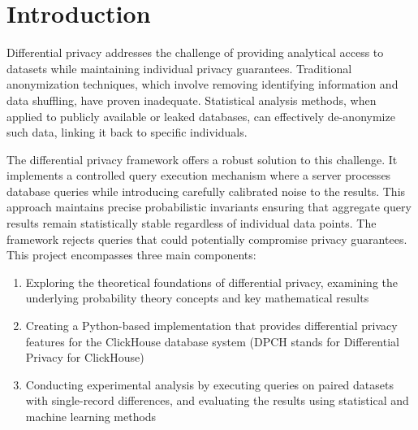 \documentclass[12pt,letterpaper]{article}
\begin{document}
\section{Introduction}
Differential privacy addresses the challenge of providing analytical access to datasets while maintaining individual privacy guarantees. Traditional anonymization techniques, which involve removing identifying information and data shuffling, have proven inadequate. Statistical analysis methods, when applied to publicly available or leaked databases, can effectively de-anonymize such data, linking it back to specific individuals.

The differential privacy framework offers a robust solution to this challenge. It implements a controlled query execution mechanism where a server processes database queries while introducing carefully calibrated noise to the results. This approach maintains precise probabilistic invariants ensuring that aggregate query results remain statistically stable regardless of individual data points. The framework rejects queries that could potentially compromise privacy guarantees.\\

This project encompasses three main components:
\begin{enumerate}
\item Exploring the theoretical foundations of differential privacy, examining the underlying probability theory concepts and key mathematical results
\item Creating a Python-based implementation that provides differential privacy features for the ClickHouse database system (DPCH stands for Differential Privacy for ClickHouse)
\item Conducting experimental analysis by executing queries on paired datasets with single-record differences, and evaluating the results using statistical and machine learning methods
\end{enumerate}
\end{document}
